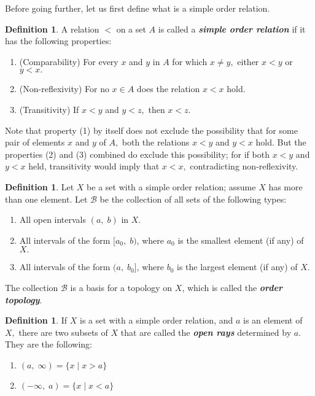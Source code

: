 \documentclass{article}
\theoremstyle{definition}
\newtheorem{defn}[theorem]{Definition}
\begin{document}
Before going further, let us first define what is a simple order relation.
\begin{defn}
  A relation $<$ on a set $A$ is called a \textbf{\emph{simple order relation}} if it has the following properties:
  \begin{enumerate}[nosep, label = (\arabic*)] 
    \item (Comparability) For every $x$ and $y$ in $A$ for which $x \neq y,$ either $x < y$ or $y < x.$
    \item (Non-reflexivity) For no $x \in A$ does the relation $x < x$ hold.
    \item (Transitivity) If $x < y$ and $y < z,$ then $x < z.$
  \end{enumerate}
\end{defn}
Note that property (1) by itself does not exclude the possibility that for some pair of elements $x$ and $y$ of $A,$ both the relations $x < y$ and $y < x$ hold. But the properties (2) and (3) combined do exclude this possibility; for if both $x < y$ and $y < x$ held, transitivity would imply that $x < x,$ contradicting non-reflexivity.\\
\begin{defn} 
  Let $X$ be a set with a simple order relation; assume $X$ has more than one element. Let $\mathcal{B}$ be the collection of all sets of the following types:
  \begin{enumerate}[nosep] 
    \item All open intervals $(a,\; b)$ in $X.$
    \item All intervals of the form $[a_0,\; b)$, where $a_0$ is the smallest element (if any) of $X.$
    \item All intervals of the form $(a,\; b_0]$, where $b_0$ is the largest element (if any) of $X.$
  \end{enumerate}
  The collection $\mathcal{B}$ is a basis for a topology on $X$, which is called the \textbf{\emph{order topology}}.
\end{defn}
\begin{defn}
  If $X$ is a set with a simple order relation, and $a$ is an element of $X,$ there are two subsets of $X$ that are called the \textbf{\emph{open rays}} determined by $a.$ They are the following:
  \begin{enumerate}[nosep] 
    \item $(a,\; \infty) = \{x\;|\;x > a\}$
    \item $(-\infty,\; a) = \{x\;|\;x < a\}$
  \end{enumerate}
\end{defn}
\end{document}
